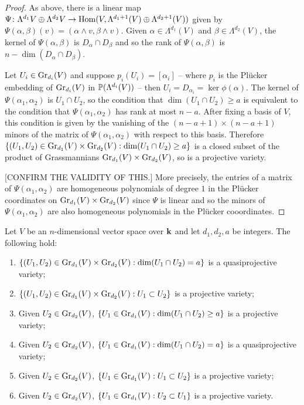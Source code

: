 \documentclass[a4paper, 11pt]{report}
\begin{document}
\begin{proof}
As above, there is a linear map $\Psi\colon\Lambda^{d_1}{V}\oplus\Lambda^{d_2}{V}\to\HOM(V,\Lambda^{d_1+1}(V)\oplus\Lambda^{d_2+1}(V))$ given by $\Psi(\alpha,\beta)(v) = (\alpha\wedge v,\beta\wedge v)$. Given $\alpha\in\Lambda^{d_1}(V)$ and $\beta\in\Lambda^{d_2}(V)$, the kernel of $\Psi(\alpha,\beta)$ is $D_\alpha\cap D_\beta$ and so the rank of $\Psi(\alpha,\beta)$ is $n-\dim(D_\alpha\cap D_\beta)$.

Let $U_i\in\GR[d_i]{V}$ and suppose $p_i(U_i)=[\alpha_i]$ -- where $p_i$ is the Pl\"ucker embedding of $\GR[d_i]{V}$ in $\Proj{(\Lambda^{d_i}(V))}$ -- then $U_i = D_{\alpha_i} = \ker{\phi(\alpha)}$. The kernel of $\Psi(\alpha_1,\alpha_2)$ is $U_1\cap U_2$, so the condition that $\dim(U_1\cap U_2)\geq a$ is equivalent to the condition that $\Psi(\alpha_1,\alpha_2)$ has rank at most $n-a$. After fixing a basis of $V$, this condition is given by the vanishing of the $(n-a+1)\times(n-a+1)$ minors of the matrix of $\Psi(\alpha_1,\alpha_2)$ with respect to this basis. Therefore $\{(U_1,U_2)\in\GR[d_1]{V}\times\GR[d_2]{V}:\dim(U_1\cap U_2)\geq a\}$ is a closed subset of the product of Grassmannians $\GR[d_1]{V}\times\GR[d_2]{V}$, so is a projective variety.

{\color{gray}[CONFIRM THE VALIDITY OF THIS.] More precisely, the entries of a matrix of $\Psi(\alpha_1,\alpha_2)$ are homogeneous polynomials of degree $1$ in the Pl\"ucker coordinates on $\GR[d_1]{V}\times\GR[d_2]{V}$ since $\Psi$ is linear and so the minors of $\Psi(\alpha_1,\alpha_2)$ are also homogeneous polynomials in the Pl\"ucker cooordinates.}
\end{proof}

\begin{lemma}
Let $V$ be an $n$-dimensional vector space over $\field$ and let $d_1,d_2,a$ be integers. The following hold:
\begin{enumerate}
\item
$\{(U_1,U_2)\in\GR[d_1]{V}\times\GR[d_2]{V}: \dim(U_1\cap U_2) = a\}$ is a quasiprojective variety;
\item
$\{(U_1,U_2)\in\GR[d_1]{V}\times\GR[d_2]{V}: U_1\subset U_2\}$ is a projective variety;
\item
Given $U_2\in\GR[d_2]{V}$, $\{U_1\in\GR[d_1]{V}: \dim(U_1\cap U_2)\geq a\}$ is a projective variety;
\item
Given $U_2\in\GR[d_2]{V}$, $\{U_1\in\GR[d_1]{V}:\dim(U_1\cap U_2) = a\}$ is a quasiprojective variety;
\item
Given $U_2\in\GR[d_2]{V}$, $\{U_1\in\GR[d_1]{V}: U_1\subset U_2\}$ is a projective variety;
\item
Given $U_2\in\GR[d_2]{V}$, $\{U_1\in\GR[d_1]{V}: U_2\subset U_1\}$ is a projective variety.
\end{enumerate}
\end{lemma}
\end{document}
